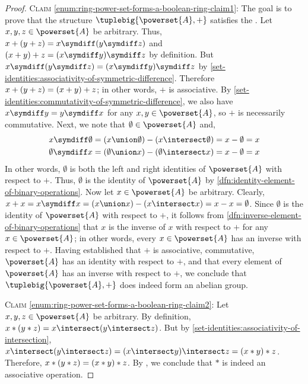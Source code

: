\begin{proof}
    \vspace{0.5cm}
    \noindent
    \textsc{Claim} \ref{enum:ring-power-set-forms-a-boolean-ring-claim1}:
    The goal is to prove that the structure \( \tuplebig{\powerset{A},+} \) satisfies the .
    Let \( x, y, z \in \powerset{A} \) be arbitrary. Thus, \( x + \mleft( y + z \mright) = x \symdiff \mleft( y \symdiff z \mright) \)
    and \( \mleft( x + y \mright) + z = \mleft( x \symdiff y \mright) \symdiff z \) by definition.
    But \( x \symdiff \mleft( y \symdiff z \mright) = \mleft( x \symdiff y \mright) \symdiff z \) by \cref{set-identities:associativity-of-symmetric-difference}.
    Therefore \( x + \mleft( y + z \mright) = \mleft( x + y \mright) + z \); in other words, \( + \) is associative.
    By \cref{set-identities:commutativity-of-symmetric-difference}, we also have \( x \symdiff y = y \symdiff x \) for any \( x,y \in \powerset{A} \), so
    \( + \) is necessarily commutative.
    Next, we note that \( \emptyset \in \powerset{A} \) and,
    \begin{gather*}
        x \symdiff \emptyset = \mleft( x \union \emptyset \mright) - \mleft( x \intersect \emptyset \mright) = x - \emptyset = x\\
        \emptyset \symdiff x = \mleft( \emptyset \union x \mright) - \mleft( \emptyset \intersect x \mright) = x - \emptyset = x
    \end{gather*}
    In other words, \( \emptyset \) is both the left and right identities of \( \powerset{A} \) with respect to \( + \).
    Thus, \( \emptyset \) is the identity of \( \powerset{A} \) by \cref{dfn:identity-element-of-binary-operations}.
    Now let \( x \in \powerset{A} \) be arbitrary.
    Clearly, \( x + x = x \symdiff x = \mleft( x \union x \mright) - \mleft( x \intersect x \mright) = x - x = \emptyset \).
    Since \( \emptyset \) is the identity of \( \powerset{A} \) with respect to \( + \), it follows from \cref{dfn:inverse-element-of-binary-operations}
    that \( x \) is the inverse of \( x \) with respect to \( + \) for any \( x \in \powerset{A} \); in other words, every \( x \in \powerset{A} \)
    has an inverse with respect to \( + \). Having established that \( + \) is associative, commutative, \( \powerset{A} \) has an identity with
    respect to \( + \), and that every element of \( \powerset{A} \) has an inverse with respect to \( + \), we conclude that \( \tuplebig{\powerset{A},+} \)
    does indeed form an abelian group.

    \vspace{0.5cm}
    \noindent
    \textsc{Claim} \ref{enum:ring-power-set-forms-a-boolean-ring-claim2}:
    Let \( x, y, z \in \powerset{A} \) be arbitrary.
    By definition,
    \( x \ast \mleft( y \ast z \mright) = x \intersect \mleft( y \intersect z \mright) \). But by \cref{set-identities:associativity-of-intersection},
    \( x \intersect \mleft( y \intersect z \mright) = \mleft( x \intersect y \mright) \intersect z = \mleft( x \ast y \mright) \ast z \). Therefore,
    \( x \ast \mleft( y \ast z \mright) = \mleft( x \ast y \mright) \ast z \). By , we conclude that \( \ast \) is indeed
    an associative operation.


\end{proof}
